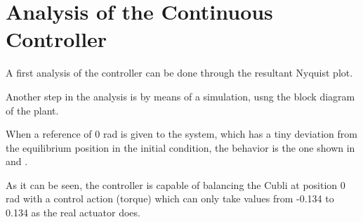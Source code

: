 \section{Analysis of the Continuous Controller}\label{analysisController}
A first analysis of the controller can be done through the resultant Nyquist plot.


Another step in the analysis is by means of a simulation, usng the block diagram of the plant.


When a reference of 0 rad is given to the system, which has a tiny deviation from the equilibrium position in the initial condition, the behavior is the one shown in  and .


As it can be seen, the controller is capable of balancing the Cubli at position 0 rad with a control action (torque) which can only take values from -0.134 to 0.134 as the real actuator does.